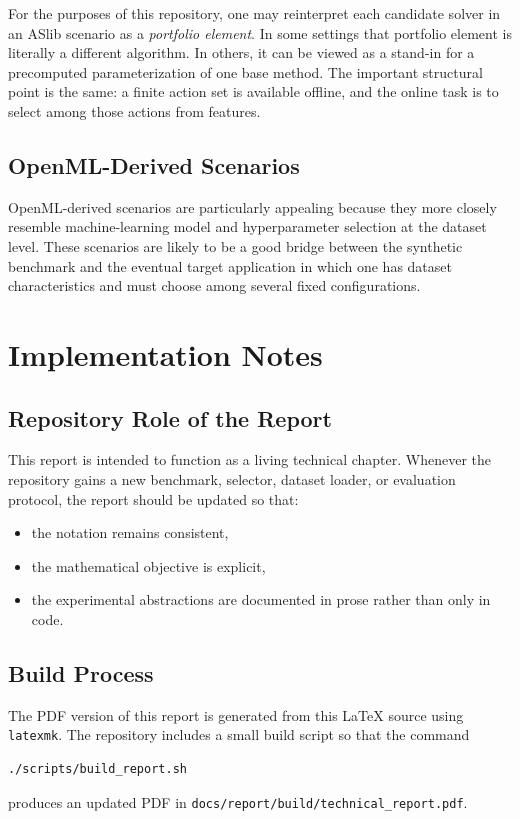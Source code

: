 \documentclass[11pt]{report}
\begin{document}
For the purposes of this repository, one may reinterpret each candidate solver in an ASlib scenario as a \emph{portfolio element}. In some settings that portfolio element is literally a different algorithm. In others, it can be viewed as a stand-in for a precomputed parameterization of one base method. The important structural point is the same: a finite action set is available offline, and the online task is to select among those actions from features.

\section{OpenML-Derived Scenarios}

OpenML-derived scenarios are particularly appealing because they more closely resemble machine-learning model and hyperparameter selection at the dataset level. These scenarios are likely to be a good bridge between the synthetic benchmark and the eventual target application in which one has dataset characteristics and must choose among several fixed configurations.

\chapter{Implementation Notes}

\section{Repository Role of the Report}

This report is intended to function as a living technical chapter. Whenever the repository gains a new benchmark, selector, dataset loader, or evaluation protocol, the report should be updated so that:
\begin{itemize}[leftmargin=2em]
\item the notation remains consistent,
\item the mathematical objective is explicit,
\item the experimental abstractions are documented in prose rather than only in code.
\end{itemize}

\section{Build Process}

The PDF version of this report is generated from this \LaTeX{} source using \texttt{latexmk}. The repository includes a small build script so that the command
\begin{verbatim}
./scripts/build_report.sh
\end{verbatim}
produces an updated PDF in \texttt{docs/report/build/technical\_report.pdf}.
\end{document}
